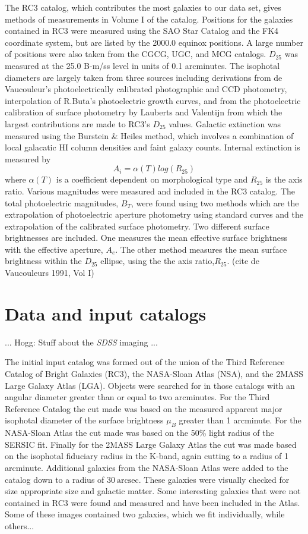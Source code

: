 \documentclass[12pt,preprint,pdftex]{aastex}
\newcommand{\project}[1]{\textsl{#1}}
\newcommand{\units}[1]{\mathrm{#1}}
\renewcommand{\arcsec}{\units{arcsec}}
\begin{document}
The RC3 catalog, which contributes the most galaxies to our data set, gives methods of measurements in Volume I of the catalog. Positions for the galaxies contained in RC3 were measured using the SAO Star Catalog and the FK4 coordinate system, but are listed by the 2000.0 equinox positions. A large number of positions were also taken from the CGCG, UGC, and MCG catalogs. $D_{25}$ was measured at the 25.0 B-m/ss level in units of 0.1 arcminutes. The isophotal diameters are largely taken from three sources including derivations from de Vaucouleur's photoelectrically calibrated photographic and CCD photometry, interpolation of R.Buta's photoelectric growth curves, and from the photoelectric calibration of surface photometry by Lauberts and Valentijn from which the largest contributions are made to RC3's $D_{25}$ values. Galactic extinction was measured using the Burstein \& Heiles method, which involves a combination of local galacatic HI column densities and faint galaxy counts. Internal extinction is measured by \begin{equation} A_i= \alpha(T)log(R_{25}) \end{equation} where $\alpha(T)$ is a coefficient dependent on morphological type and $R_{25}$ is the axis ratio. Various magnitudes were measured and included in the RC3 catalog. The total photoelectric magnitudes, $B_T$, were found using two methods which are the extrapolation of photoelectric aperture photometry using standard curves and the extrapolation of the calibrated surface photometry. Two different surface brightnesses are included. One measures the mean effective surface brightness with the effective aperture, $A_e$. The other method measures the mean surface brightness within the $D_{25}$ ellipse, using the the axis ratio,$R_{25}$. (cite de Vaucouleurs 1991, Vol I)

\section{Data and input catalogs}

... Hogg: Stuff about the \project{SDSS} imaging ...

The initial input catalog was formed out of the union of the Third Reference Catalog of Bright Galaxies (RC3), the NASA-Sloan Atlas (NSA), and the 2MASS Large Galaxy Atlas (LGA). Objects were searched for in those catalogs with an angular diameter greater than or equal to two arcminutes. For the Third Reference Catalog the cut made was based on the measured apparent major isophotal diameter of the surface brightness $\mu_{B}$ greater than 1 arcminute. For the NASA-Sloan Atlas the cut made was based on the 50\% light radius of the SERSIC fit. Finally for the 2MASS Large Galaxy Atlas the cut was made based on the isophotal fiduciary radius in the K-band, again cutting to a radius of 1 arcminute. Additional galaxies from the NASA-Sloan Atlas were added to the catalog down to a radius of $30~\arcsec$. These galaxies were visually checked for size appropriate size and galactic matter. Some interesting galaxies that were not contained in RC3 were found and measured and have been included in the Atlas. Some of these images contained two galaxies, which we fit individually, while others...
\end{document}
